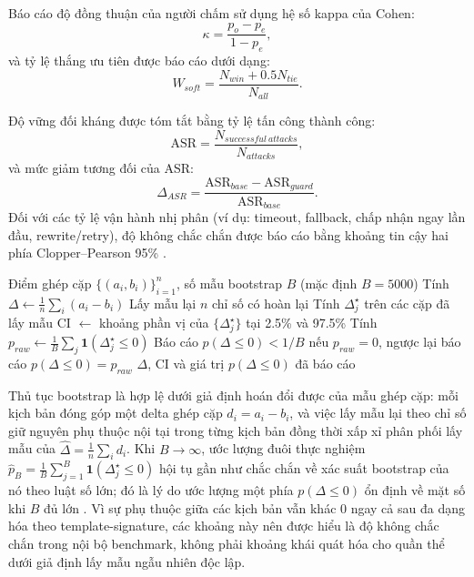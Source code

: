 ﻿\documentclass[a4paper,12pt]{article}
\newcommand{\ind}{\mathbf{1}}
\newcommand{\BootstrapSamples}{5000}
\begin{document}
Báo cáo độ đồng thuận của người chấm sử dụng hệ số kappa của Cohen:
\begin{equation}
\kappa=\frac{p_o-p_e}{1-p_e},
\end{equation}
và tỷ lệ thắng ưu tiên được báo cáo dưới dạng:
\begin{equation}
W_{soft}=\frac{N_{win}+0.5N_{tie}}{N_{all}}.
\end{equation}

Độ vững đối kháng được tóm tắt bằng tỷ lệ tấn công thành công:
\begin{equation}
\mathrm{ASR}=\frac{N_{successful\ attacks}}{N_{attacks}},
\end{equation}
và mức giảm tương đối của ASR:
\begin{equation}
\Delta_{ASR}= \frac{\mathrm{ASR}_{base}-\mathrm{ASR}_{guard}}{\mathrm{ASR}_{base}}.
\end{equation}
Đối với các tỷ lệ vận hành nhị phân (ví dụ: timeout, fallback, chấp nhận ngay lần đầu, rewrite/retry), độ không chắc chắn được báo cáo bằng khoảng tin cậy hai phía Clopper--Pearson 95\% \cite{Clopper1934Binomial}.

\begin{algorithm}[H]
\caption{Kiểm định bootstrap ghép cặp}
\begin{algorithmic}[1]
\Require Điểm ghép cặp \(\{(a_i,b_i)\}_{i=1}^{n}\), số mẫu bootstrap \(B\) (mặc định \(B=\BootstrapSamples\))
\State Tính \(\Delta \gets \frac{1}{n}\sum_i(a_i-b_i)\)
\State Lấy mẫu lại \(n\) chỉ số có hoàn lại
\State Tính \(\Delta_j^\star\) trên các cặp đã lấy mẫu
\EndFor
\State CI \(\gets\) khoảng phần vị của \(\{\Delta_j^\star\}\) tại 2.5\% và 97.5\%
\State Tính \(p_{raw}\gets \frac{1}{B}\sum_j \ind(\Delta_j^\star\le0)\)
\State Báo cáo \(p(\Delta\le0)<1/B\) nếu \(p_{raw}=0\), ngược lại báo cáo \(p(\Delta\le0)=p_{raw}\)
\State \Return \(\Delta\), CI và giá trị \(p(\Delta\le0)\) đã báo cáo
\end{algorithmic}
\end{algorithm}

Thủ tục bootstrap là hợp lệ dưới giả định hoán đổi được của mẫu ghép cặp: mỗi kịch bản đóng góp một delta ghép cặp \(d_i=a_i-b_i\), và việc lấy mẫu lại theo chỉ số giữ nguyên phụ thuộc nội tại trong từng kịch bản đồng thời xấp xỉ phân phối lấy mẫu của \(\hat{\Delta}=\frac{1}{n}\sum_i d_i\). Khi \(B\to\infty\), ước lượng đuôi thực nghiệm
\(\hat{p}_B=\frac{1}{B}\sum_{j=1}^{B}\ind(\Delta_j^\star\le0)\)
hội tụ gần như chắc chắn về xác suất bootstrap của nó theo luật số lớn; đó là lý do ước lượng một phía \(p(\Delta\le0)\) ổn định về mặt số khi \(B\) đủ lớn \cite{Efron1979Bootstrap}. Vì sự phụ thuộc giữa các kịch bản vẫn khác 0 ngay cả sau đa dạng hóa theo template-signature, các khoảng này nên được hiểu là độ không chắc chắn trong nội bộ benchmark, không phải khoảng khái quát hóa cho quần thể dưới giả định lấy mẫu ngẫu nhiên độc lập.
\end{document}
